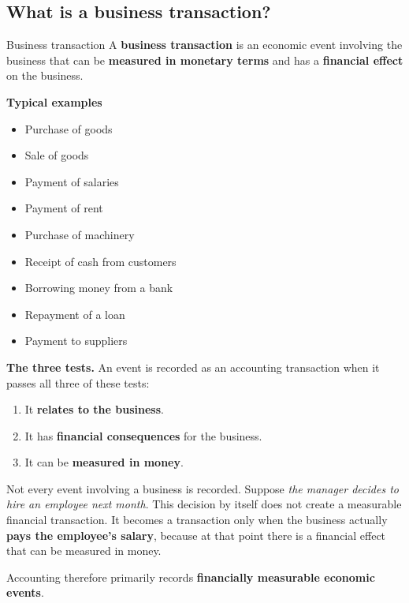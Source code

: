 \documentclass[11pt,a4paper]{article}
\begin{document}
\subsection{What is a business transaction?}

\begin{defbox}{Business transaction}
A \textbf{business transaction} is an economic event involving the business that can be
\textbf{measured in monetary terms} and has a \textbf{financial effect} on the business.
\end{defbox}

\textbf{Typical examples}

\begin{itemize}
  \item Purchase of goods
  \item Sale of goods
  \item Payment of salaries
  \item Payment of rent
  \item Purchase of machinery
  \item Receipt of cash from customers
  \item Borrowing money from a bank
  \item Repayment of a loan
  \item Payment to suppliers
\end{itemize}

\textbf{The three tests.} An event is recorded as an accounting transaction when it passes
all three of these tests:

\begin{enumerate}
  \item It \textbf{relates to the business}.
  \item It has \textbf{financial consequences} for the business.
  \item It can be \textbf{measured in money}.
\end{enumerate}

\begin{impbox}
Not every event involving a business is recorded. Suppose \emph{the manager decides to hire an
employee next month}. This decision by itself does not create a measurable financial
transaction. It becomes a transaction only when the business actually \textbf{pays the
employee's salary}, because at that point there is a financial effect that can be measured
in money.

Accounting therefore primarily records \textbf{financially measurable economic events}.
\end{impbox}
\end{document}
